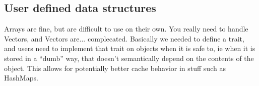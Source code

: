 \documentclass[12pt,final]{article}
\begin{document}
\subsection{User defined data structures}
Arrays are fine, but are difficult to use on their own. You really need to
handle Vectors, and Vectors are... complecated. Basically we needed to define a
trait, and users need to implement that trait on objects when it is safe to, ie
when it is stored in a ``dumb'' way, that doesn't semantically depend on the
contents of the object. This allows for potentially better cache behavior in
stuff such as HashMaps.

{}

\end{document}
